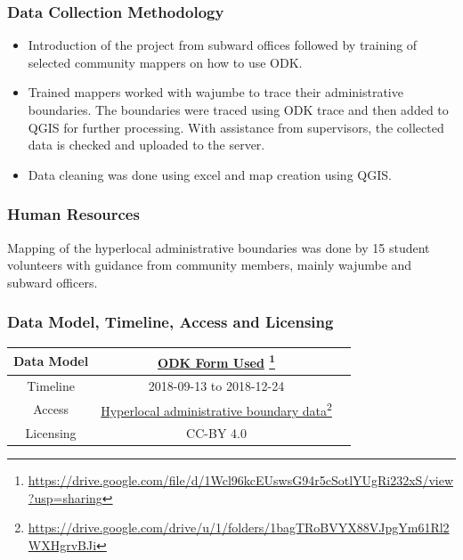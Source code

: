 \documentclass[a4paper,12pt,twoside]{article}
\begin{document}
\subsubsection{Data Collection Methodology}
\begin{itemize}
    \item Introduction of the project from subward offices followed by training of selected community mappers on how to use ODK.
    \item Trained mappers worked with wajumbe to trace their administrative boundaries. The boundaries were traced using ODK trace and then added to QGIS for further processing. With assistance from supervisors, the collected data is checked and uploaded to the server. 
    \item Data cleaning was done using excel  and map creation using QGIS.
\end{itemize}

\subsubsection{Human Resources}
Mapping of the hyperlocal administrative boundaries was done by 15 student volunteers with guidance from community members, mainly wajumbe and subward officers.

\subsubsection{Data Model, Timeline, Access and Licensing}
\begin{center}
\begin{tabular}{|c|c|c|}  
 \hline
Data Model &
        \href{https://drive.google.com/file/d/1Wcl96kcEUswsG94r5cSotlYUgRi232xS/view?usp=sharing}{ODK Form Used} \footnote{\url{https://drive.google.com/file/d/1Wcl96kcEUswsG94r5cSotlYUgRi232xS/view?usp=sharing}} \\
 \hline
  Timeline  &  2018-09-13 to 2018-12-24 \\
\hline  
 Access  & 
    \href{https://drive.google.com/drive/u/1/folders/1bagTRoBVYX88VJpgYm61Rl2WXHgrvBJi}{Hyperlocal administrative boundary data}\footnote{\url{https://drive.google.com/drive/u/1/folders/1bagTRoBVYX88VJpgYm61Rl2WXHgrvBJi}} \\
   
\hline 
    Licensing & CC-BY 4.0 \\
\hline
\end{tabular}
\end{center}
\end{document}
